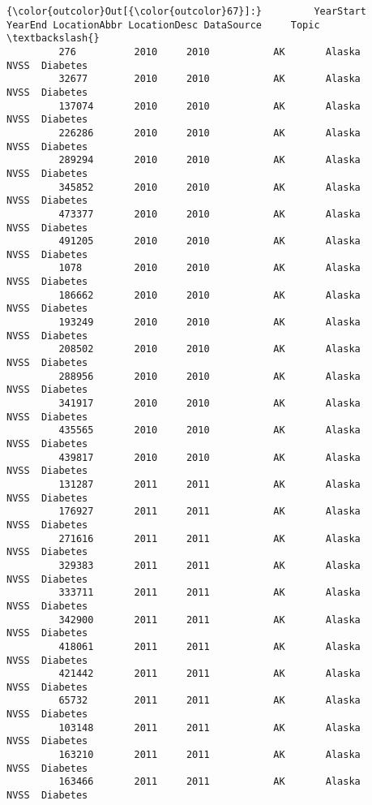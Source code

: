 \documentclass[11pt]{article}
\begin{document}
\begin{Verbatim}[commandchars=\\\{\}]
{\color{outcolor}Out[{\color{outcolor}67}]:}         YearStart  YearEnd LocationAbbr LocationDesc DataSource     Topic  \textbackslash{}
         276          2010     2010           AK       Alaska       NVSS  Diabetes   
         32677        2010     2010           AK       Alaska       NVSS  Diabetes   
         137074       2010     2010           AK       Alaska       NVSS  Diabetes   
         226286       2010     2010           AK       Alaska       NVSS  Diabetes   
         289294       2010     2010           AK       Alaska       NVSS  Diabetes   
         345852       2010     2010           AK       Alaska       NVSS  Diabetes   
         473377       2010     2010           AK       Alaska       NVSS  Diabetes   
         491205       2010     2010           AK       Alaska       NVSS  Diabetes   
         1078         2010     2010           AK       Alaska       NVSS  Diabetes   
         186662       2010     2010           AK       Alaska       NVSS  Diabetes   
         193249       2010     2010           AK       Alaska       NVSS  Diabetes   
         208502       2010     2010           AK       Alaska       NVSS  Diabetes   
         288956       2010     2010           AK       Alaska       NVSS  Diabetes   
         341917       2010     2010           AK       Alaska       NVSS  Diabetes   
         435565       2010     2010           AK       Alaska       NVSS  Diabetes   
         439817       2010     2010           AK       Alaska       NVSS  Diabetes   
         131287       2011     2011           AK       Alaska       NVSS  Diabetes   
         176927       2011     2011           AK       Alaska       NVSS  Diabetes   
         271616       2011     2011           AK       Alaska       NVSS  Diabetes   
         329383       2011     2011           AK       Alaska       NVSS  Diabetes   
         333711       2011     2011           AK       Alaska       NVSS  Diabetes   
         342900       2011     2011           AK       Alaska       NVSS  Diabetes   
         418061       2011     2011           AK       Alaska       NVSS  Diabetes   
         421442       2011     2011           AK       Alaska       NVSS  Diabetes   
         65732        2011     2011           AK       Alaska       NVSS  Diabetes   
         103148       2011     2011           AK       Alaska       NVSS  Diabetes   
         163210       2011     2011           AK       Alaska       NVSS  Diabetes   
         163466       2011     2011           AK       Alaska       NVSS  Diabetes   

\end{Verbatim}
\end{document}
